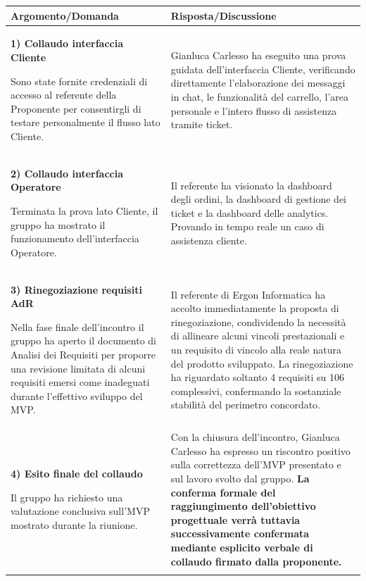 \documentclass[a4paper, 11pt, oneside]{scrartcl}
\begin{document}
\vspace{0.5cm}
\footnotesize
\setlength{\tabcolsep}{5pt}
\begin{tabularx}{\textwidth}{p{} X}
\toprule
\textbf{Argomento/Domanda} & \textbf{Risposta/Discussione} \\
\midrule

\textbf{1) Collaudo interfaccia Cliente} \par
Sono state fornite credenziali di accesso al referente della Proponente per consentirgli di testare personalmente il flusso lato Cliente.
&
Gianluca Carlesso ha eseguito una prova guidata dell'interfaccia Cliente, verificando direttamente l'elaborazione dei messaggi in chat, le funzionalità del carrello, l'area personale e l'intero flusso di assistenza tramite ticket.
\\ \addlinespace

\textbf{2) Collaudo interfaccia Operatore} \par
Terminata la prova lato Cliente, il gruppo ha mostrato il funzionamento dell'interfaccia Operatore.
&
Il referente ha visionato la dashboard degli ordini, la dashboard di gestione dei ticket e la dashboard delle analytics. Provando in tempo reale un caso di assistenza cliente.
\\ \addlinespace

\textbf{3) Rinegoziazione requisiti AdR} \par
Nella fase finale dell'incontro il gruppo ha aperto il documento di Analisi dei Requisiti per proporre una revisione limitata di alcuni requisiti emersi come inadeguati durante l'effettivo sviluppo del MVP.
&
Il referente di Ergon Informatica ha accolto immediatamente la proposta di rinegoziazione, condividendo la necessità di allineare alcuni vincoli prestazionali e un requisito di vincolo alla reale natura del prodotto sviluppato. La rinegoziazione ha riguardato soltanto 4 requisiti su 106 complessivi, confermando la sostanziale stabilità del perimetro concordato.
\\ \addlinespace

\textbf{4) Esito finale del collaudo} \par
Il gruppo ha richiesto una valutazione conclusiva sull'MVP mostrato durante la riunione.
&
Con la chiusura dell'incontro, Gianluca Carlesso ha espresso un riscontro positivo sulla correttezza dell'MVP presentato e sul lavoro svolto dal gruppo. \textbf{La conferma formale del raggiungimento dell'obiettivo progettuale verrà tuttavia successivamente confermata mediante esplicito verbale di collaudo firmato dalla proponente.}
\\ \addlinespace
\bottomrule
\end{tabularx}
\normalsize
\end{document}
